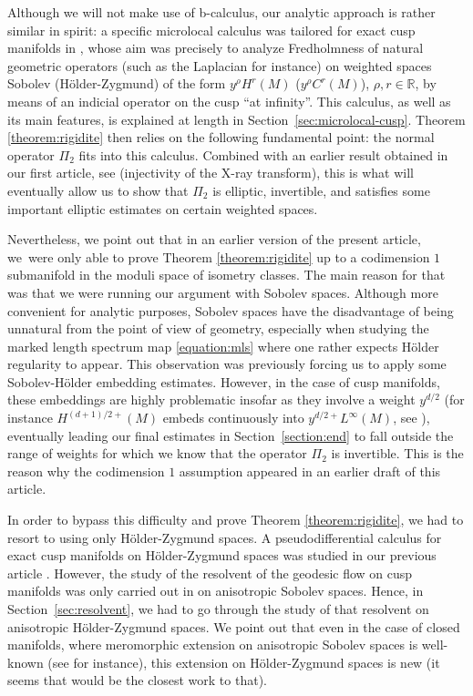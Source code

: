 \documentclass[10pt]{amsart}
\newcommand{\R}{\mathbb{R}}
\theoremstyle{plain}
\theoremstyle{definition}
\begin{document}
Although we will not make use of b-calculus, our analytic approach is rather similar in spirit: a specific microlocal calculus was tailored for exact cusp manifolds in \cite{Bonthonneau-16,Bonthonneau-Weich-17,Bonthonneau-Lefeuvre-19-1}, whose aim was precisely to analyze Fredholmness of natural geometric operators (such as the Laplacian for instance) on weighted spaces Sobolev (\resp Hölder-Zygmund) of the form $y^\rho H^r(M)$ (\resp $y^\rho C^r(M)$), $\rho,r \in \R$, by means of an indicial operator on the cusp ``at infinity''. This calculus, as well as its main features, is explained at length in Section~\ref{sec:microlocal-cusp}. Theorem \ref{theorem:rigidite} then relies on the following fundamental point: the normal operator $\Pi_2$ fits into this calculus. Combined with an earlier result obtained in our first article, see \cite[Th.\,1]{Bonthonneau-Lefeuvre-19-1} (injectivity of the X-ray transform), this is what will eventually allow us to show that $\Pi_2$ is elliptic, invertible, and satisfies some important elliptic estimates on certain weighted spaces.

Nevertheless, we point out that in an earlier version of the present article, we~were only able to prove Theorem \ref{theorem:rigidite} up to a codimension $1$ submanifold in the moduli space of isometry classes. The main reason for that was that we were running our argu\-ment with Sobolev spaces. Although more convenient for analytic purposes, Sobolev spaces have the disadvantage of being unnatural from the point of view of geometry, especially when studying the marked length spectrum map \eqref{equation:mls} where one rather expects Hölder regularity to appear. This observation was previously \hbox{forcing} us to apply some Sobolev-Hölder embedding estimates. However, in the case of cusp manifolds, these embeddings are highly problematic insofar as they involve a weight $y^{d/2}$ (for instance $H^{(d+1)/2+}(M)$ embeds continuously into $y^{d/2+}L^\infty(M)$, see \cite[Lem.\,2.1]{Bonthonneau-Lefeuvre-19-1}), eventually leading our final estimates in Section~\ref{section:end} to fall outside the range of weights for which we know that the operator $\Pi_2$ is invertible. This is the reason why the codimension $1$ assumption appeared in an earlier draft of this article.

In order to bypass this difficulty and prove Theorem \ref{theorem:rigidite}, we had to resort to using only Hölder-Zygmund spaces. A pseudodifferential calculus for exact cusp manifolds on Hölder-Zygmund spaces was studied in our previous article \cite{Bonthonneau-Lefeuvre-19-1}. However, the study of the resolvent of the geodesic flow on cusp manifolds was only carried out in \cite{Bonthonneau-Weich-17} on anisotropic Sobolev spaces. Hence, in Section~\ref{sec:resolvent}, we had to go through the study of that resolvent on anisotropic Hölder-Zygmund spaces. We point out that even in the case of closed manifolds, where meromorphic extension on anisotropic Sobolev spaces is well-known (see \cite{Faure-Sjostrand-11, Dyatlov-Zworski-16} for instance), this extension on Hölder-Zygmund spaces is new (it seems that \cite{Adam-Baladi-21} would be the closest work to that).
\end{document}
